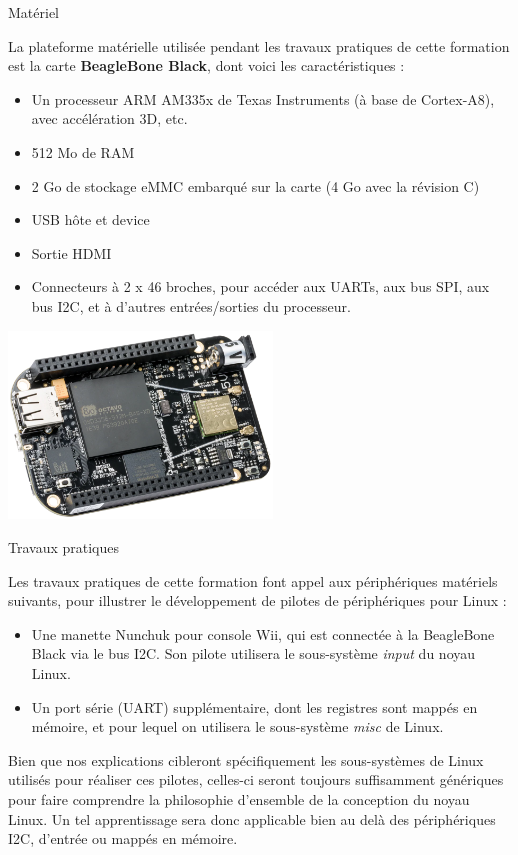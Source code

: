 \documentclass[a4paper,12pt,obeyspaces,spaces,hyphens]{article}
\begin{document}
\feagendatwocolumn
{Matériel}
{
  La plateforme matérielle utilisée pendant les travaux pratiques de
  cette formation est la carte {\bf BeagleBone Black}, dont voici les
  caractéristiques :

  \begin{itemize}
  \item Un processeur ARM AM335x de Texas Instruments (à base de
    Cortex-A8), avec accélération 3D, etc.
  \item 512 Mo de RAM
  \item 2 Go de stockage eMMC embarqué sur la carte
	\newline(4 Go avec la révision C)
  \item USB hôte et device
  \item Sortie HDMI
  \item Connecteurs à 2 x 46 broches, pour accéder aux UARTs, aux
        bus SPI, aux bus I2C, et à d'autres entrées/sorties du
        processeur.
  \end{itemize}
}
{}
{
  \begin{center}
    \includegraphics[height=5cm]{../slides/beagleboneblack-board/beagleboneblack.png}
  \end{center}
}

\feagendaonecolumn
{Travaux pratiques}
{
  Les travaux pratiques de cette formation font appel aux périphériques
  matériels suivants, pour illustrer le développement de pilotes de
  périphériques pour Linux :

  \begin{itemize}
  \item Une manette Nunchuk pour console Wii, qui est connectée à la
    BeagleBone Black via le bus I2C. Son pilote utilisera le
    sous-système {\em input} du noyau Linux.
  \item Un port série (UART) supplémentaire, dont les registres sont
    mappés en mémoire, et pour lequel on utilisera le sous-système {\em
    misc} de Linux.
  \end{itemize}

  Bien que nos explications cibleront spécifiquement les sous-systèmes
  de Linux utilisés pour réaliser ces pilotes, celles-ci seront toujours
  suffisamment génériques pour faire comprendre la philosophie
  d'ensemble de la conception du noyau Linux. Un tel apprentissage
  sera donc applicable bien au delà des périphériques I2C, d'entrée ou
  mappés en mémoire.
}
\end{document}
